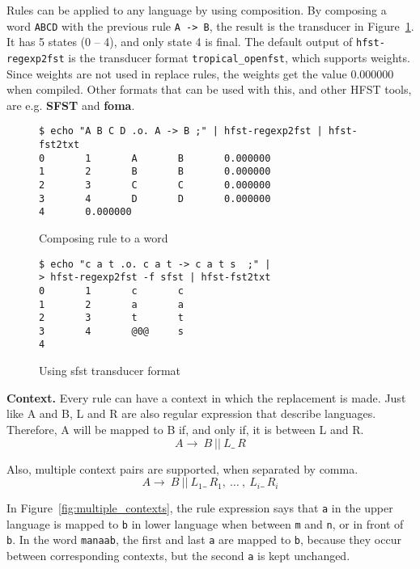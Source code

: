 \documentclass{llncs}
\begin{document}
Rules can be applied to any language by using composition. 
By composing a word \verb!ABCD! with the previous rule \verb!A -> B!, 
the result is the transducer in Figure~\ref{fig:replace_compose}. 
It has 5 states (0 -- 4), and only state 4 is final. The default output of \verb!hfst-regexp2fst! is 
the transducer format \verb!tropical_openfst!, which supports weights. 
Since weights are not used in replace rules, the weights get the value 0.000000 when compiled. 
Other formats that can be used with this, and other HFST tools, are e.g. \textbf{SFST} and \textbf{foma}.

\begin{figure} [h!]
\begin{verbatim}
$ echo "A B C D .o. A -> B ;" | hfst-regexp2fst | hfst-fst2txt
0       1       A       B       0.000000
1       2       B       B       0.000000
2       3       C       C       0.000000
3       4       D       D       0.000000
4       0.000000
\end{verbatim}
\caption{Composing rule to a word}
\label{fig:replace_compose}
\end{figure}


\begin{figure} [h!]
\begin{verbatim}
$ echo "c a t .o. c a t -> c a t s  ;" |
> hfst-regexp2fst -f sfst | hfst-fst2txt
0       1       c       c
1       2       a       a
2       3       t       t
3       4       @0@     s
4
\end{verbatim}
\caption{Using sfst transducer format}
\label{fig:sfst_format}
\end{figure}



\textbf{Context.} Every rule can have a context in which the replacement is made. 
Just like A and B, L and R are also regular expression that describe languages. 
Therefore, A will be mapped to B if, and only if, it is between L and R.
\begin{equation}
  A \rightarrow\ B\ ||\ L \_\  R
\end{equation}

Also, multiple context pairs are supported, when separated by comma.
\begin{equation}
  A \rightarrow\ B\ ||\ L_1 \_\  R_1 ,\ \ldots\ ,\ L_i \_\  R_i
\end{equation}

In Figure~\ref{fig:multiple_contexts}, the rule expression says that \verb!a! in the 
upper language is mapped to \verb!b! in lower language 
when between \verb!m! and \verb!n!, or in front of \verb!b!. 
In the word \verb!manaab!, the first and last \verb!a! are mapped to \verb!b!, 
because they occur between corresponding contexts, but the second \verb!a! is kept unchanged.
\end{document}
